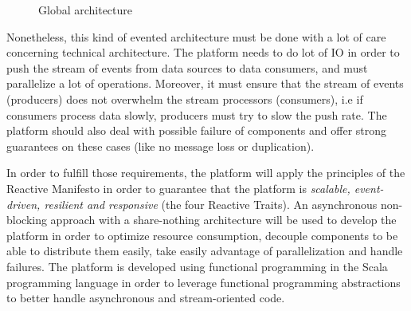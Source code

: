 \begin{figure}[h]
  \begin{center}
    \caption{Global architecture}
    \label{fig:main_archi}
  \end{center}
\end{figure}

Nonetheless, this kind of evented architecture must be done with a lot of care concerning technical architecture.
The platform needs to do lot of IO in order to push the stream of events from data sources to data consumers, and must
parallelize a lot of operations. Moreover, it must ensure that the stream of events (producers) does not overwhelm the stream
processors (consumers), i.e if consumers process data slowly, producers must try to slow the push rate. The platform should also deal with possible
failure of components and offer strong guarantees on these cases (like no message loss or duplication).

In order to fulfill those requirements, the platform will apply the principles of the Reactive Manifesto  in order to guarantee
that the platform is \textit{scalable, event-driven, resilient and responsive} (the four Reactive Traits). An asynchronous non-blocking approach with a share-nothing architecture will be used to develop the platform in order to optimize resource consumption, decouple components to be able to distribute them easily, take easily advantage of parallelization and handle failures. 
The platform is developed using functional programming in the Scala programming language  in order to leverage functional programming abstractions to better handle asynchronous and stream-oriented code.
\\

